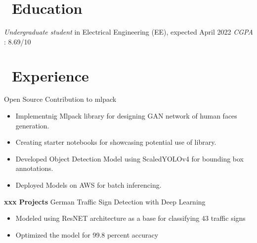 \documentclass{resume}
\begin{document}



\section{\faGraduationCap\ Education}
\textit{Undergraduate student} in Electrical Engineering (EE), expected April 2022
\textit {CGPA} : 8.69/10


\section{\faUsers\ Experience}
\role{Student Developer}
Open Source Contribution to mlpack
\begin{itemize}
  \item Implementnig Mlpack library for designing GAN network of human faces generation.
  \item Creating starter notebooks for showcasing potential use of library.
\end{itemize}

\begin{itemize}
  \item Developed Object Detection Model using ScaledYOLOv4 for bounding box annotations.
  \item Deployed Models on AWS for batch inferencing.
\end{itemize}

\textbf{xxx Projects}
German Traffic Sign Detection with Deep Learning
\begin{itemize}
  \item Modeled using ResNET architecture as a base for classifying 43 traffic signs
  \item Optimized the model for 99.8 percent accuracy
\end{itemize}
\end{document}
